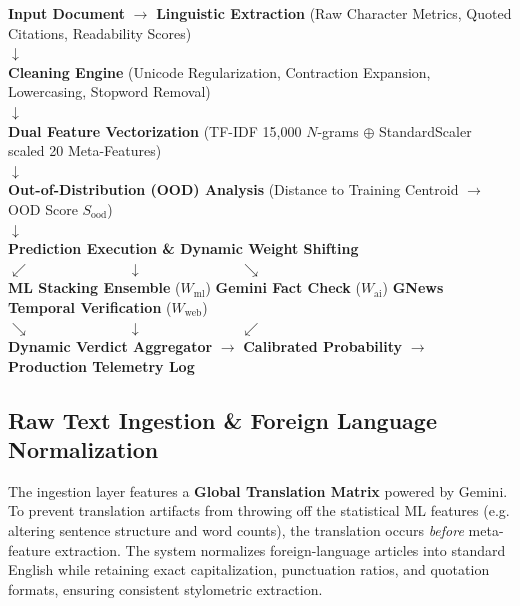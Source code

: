 \documentclass[11pt,a4paper,oneside]{article}
\begin{document}
\begin{tcolorbox}[title=\textbf{Forensic Data Flow and Ingestion Pipeline}]
    \centering
    \small
    \textbf{Input Document} $\rightarrow$ \textbf{Linguistic Extraction} (Raw Character Metrics, Quoted Citations, Readability Scores) \\
    $\downarrow$ \\
    \textbf{Cleaning Engine} (Unicode Regularization, Contraction Expansion, Lowercasing, Stopword Removal) \\
    $\downarrow$ \\
    \textbf{Dual Feature Vectorization} (TF-IDF 15,000 $N$-grams $\oplus$ StandardScaler scaled 20 Meta-Features) \\
    $\downarrow$ \\
    \textbf{Out-of-Distribution (OOD) Analysis} (Distance to Training Centroid $\rightarrow$ OOD Score $S_{\text{ood}}$) \\
    $\downarrow$ \\
    \textbf{Prediction Execution \& Dynamic Weight Shifting} \\
    $\swarrow \quad \quad \quad \quad \quad \quad \quad \downarrow \quad \quad \quad \quad \quad \quad \quad \searrow$ \\
    \textbf{ML Stacking Ensemble} ($W_{\text{ml}}$) \quad \textbf{Gemini Fact Check} ($W_{\text{ai}}$) \quad \textbf{GNews Temporal Verification} ($W_{\text{web}}$) \\
    $\searrow \quad \quad \quad \quad \quad \quad \quad \downarrow \quad \quad \quad \quad \quad \quad \quad \swarrow$ \\
    \textbf{Dynamic Verdict Aggregator} $\rightarrow$ \textbf{Calibrated Probability} $\rightarrow$ \textbf{Production Telemetry Log}
\end{tcolorbox}

\subsection{Raw Text Ingestion & Foreign Language Normalization}
The ingestion layer features a \textbf{Global Translation Matrix} powered by Gemini. To prevent translation artifacts from throwing off the statistical ML features (e.g. altering sentence structure and word counts), the translation occurs \textit{before} meta-feature extraction. The system normalizes foreign-language articles into standard English while retaining exact capitalization, punctuation ratios, and quotation formats, ensuring consistent stylometric extraction.
\end{document}
